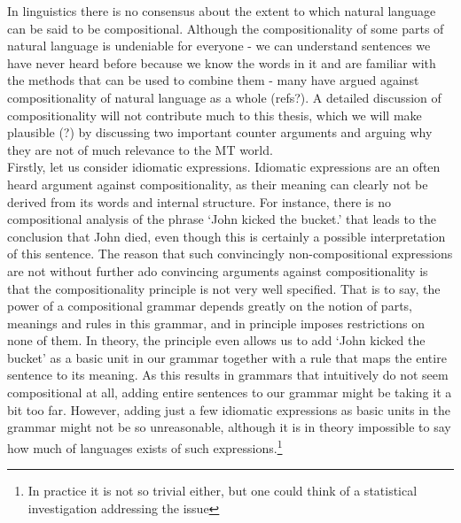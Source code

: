 \documentclass{report}
\theoremstyle{definition}
\theoremstyle{plain}
\begin{document}
In linguistics there is no consensus about the extent to which natural language can be said to be compositional. Although the compositionality of some parts of natural language is undeniable for everyone - we can understand sentences we have never heard before because we know the words in it and are familiar with the methods that can be used to combine them - many have argued against compositionality of natural language as a whole (refs?). A detailed discussion of compositionality will not contribute much to this thesis, which we will make plausible (?) by discussing two important counter arguments and arguing why they are not of much relevance to the MT world.\\
Firstly, let us consider idiomatic expressions. Idiomatic expressions are an often heard argument against compositionality, as their meaning can clearly not be derived from its words and internal structure. For instance, there is no compositional analysis of the phrase `John kicked the bucket.' that leads to the conclusion that John died, even though this is certainly a possible interpretation of this sentence. The reason that such convincingly non-compositional expressions are not without further ado convincing arguments against compositionality is that the compositionality principle is not very well specified. That is to say, the power of a compositional grammar depends greatly on the notion of parts, meanings and rules in this grammar, and in principle imposes restrictions on none of them. In theory, the principle even allows us to add `John kicked the bucket' as a basic unit in our grammar together with a rule that maps the entire sentence to its meaning. As this results in grammars that intuitively do not seem compositional at all, adding entire sentences to our grammar might be taking it a bit too far. However, adding just a few idiomatic expressions as basic units in the grammar might not be so unreasonable, although it is in theory impossible to say how much of languages exists of such expressions.\footnote{In practice it is not so trivial either, but one could think of a statistical investigation addressing the issue}\\
\end{document}
